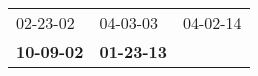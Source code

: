 \begin{supertabular}{p{0.33\columnwidth}p{0.33\columnwidth}p{0.33\columnwidth}}
          02-23-02\textsuperscript{} &           04-03-03\textsuperscript{} &  04-02-14\textsuperscript{} \\
 \textbf{10-09-02\textsuperscript{}} &  \textbf{01-23-13\textsuperscript{}} &                             \\
\end{supertabular}

